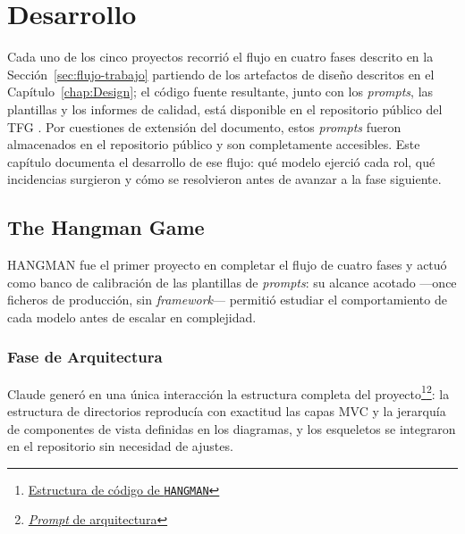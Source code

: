 
\chapter{Desarrollo} \label{chap:Development}

Cada uno de los cinco proyectos recorrió el flujo en cuatro fases descrito en la Sección~\ref{sec:flujo-trabajo} partiendo de los artefactos de diseño descritos en el Capítulo~\ref{chap:Design}; el código fuente resultante, junto con los \textit{prompts}, las plantillas y los informes de calidad, está disponible en el repositorio público del \ac{TFG} \cite{URL::TFG}. Por cuestiones de extensión del documento, estos \textit{prompts} fueron almacenados en el repositorio público y son completamente accesibles. Este capítulo documenta el desarrollo de ese flujo: qué modelo ejerció cada rol, qué incidencias surgieron y cómo se resolvieron antes de avanzar a la fase siguiente.

\section{The Hangman Game} \label{sec:dev-hangman}

\ac{HANGMAN} fue el primer proyecto en completar el flujo de cuatro fases y actuó como banco de calibración de las plantillas de \textit{prompts}: su alcance acotado —once ficheros de producción, sin \textit{framework}— permitió estudiar el comportamiento de cada modelo antes de escalar en complejidad.

\subsection{Fase de Arquitectura}

Claude generó en una única interacción la estructura completa del proyecto\footnote{\href{https://github.com/alu0101549491/TFG-Fabian-Gonzalez-Lence/blob/main/resources/project-structures/1-TheHangmanGame.md}{Estructura de código de \texttt{HANGMAN}}}\footnote{\href{https://github.com/alu0101549491/TFG-Fabian-Gonzalez-Lence/blob/main/resources/prompts/1-TheHangmanGame/1-Inicializacion/architecture.prompt.md}{\textit{Prompt} de arquitectura}}: la estructura de directorios reproducía con exactitud las capas \ac{MVC} y la jerarquía de componentes de vista definidas en los diagramas, y los esqueletos se integraron en el repositorio sin necesidad de ajustes.

